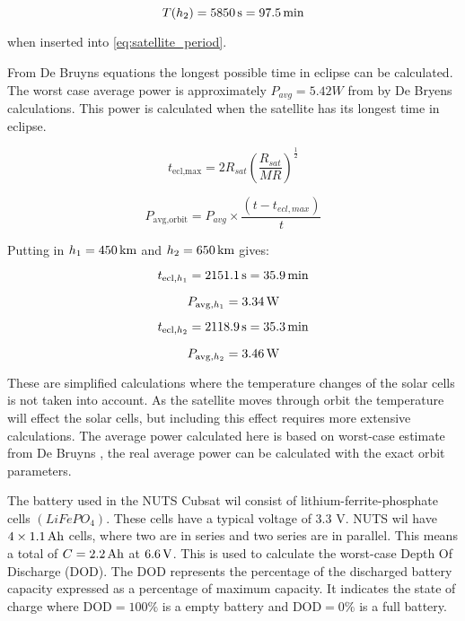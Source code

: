 \begin{equation}
T(h_2) = \unit[5850]{s} = \unit[97.5]{min}
\end{equation}

when inserted into \autoref{eq:satellite_period}.

From De Bruyns equations \cite{Satellite Power Systems} the longest possible time in eclipse can be calculated. The worst case average power is approximately $P_{avg} = 5.42 W$ from by De Bryens calculations. This power is calculated when the satellite has its longest time in eclipse.

\begin{equation}
	t_{\text{ecl,max}} = 2R_{sat}\left(\frac{R_{sat}}{MR}\right)^{\frac{1}{2}}
	\label{Maximum time in eclipse}
\end{equation}

\begin{equation}
	P_{\text{avg,orbit}} = P_{avg}\times\frac{(t-t_{ecl,max})}{t}
	\label{Average effect during one orbit}
\end{equation}

Putting in $h_1 =\unit[450]{km}$ and $h_2 = \unit[650]{km}$ gives:

\begin{equation}
t_{\text{ecl},h_1 } = \unit[2151.1]{s} = \unit[35.9]{min}
\end{equation}

\begin{equation}
P_{\text{avg},h_1} = \unit[3.34]{W}
\end{equation}

\begin{equation}
t_{\text{ecl},h_2} = \unit[2118.9]{s} = \unit[35.3]{min}
\end{equation}

\begin{equation}
P_{\text{avg},h_2} = \unit[3.46]{W}
\end{equation}

These are simplified calculations where the temperature changes of the solar cells is not taken into account. As the satellite moves through orbit the temperature will effect the solar cells, but including this effect requires more extensive calculations. The average power calculated here is based on worst-case estimate from De Bruyns \cite{Satellite Power Systems}, the real average power can be calculated with the exact orbit parameters. 

The battery used in the NUTS Cubsat wil consist of lithium-ferrite-phosphate cells $(LiFePO_4)$\cite{Overview of NUTS}. 
These cells have a typical voltage of 3.3 V. NUTS wil have $4\times \unit[1.1]{Ah}$ cells, where two are in series and two series are in parallel. This means a total of $C=\unit[2.2]{Ah}$ at $\unit[6.6]{V}$\cite{Satellite Power Systems}. This is used to calculate the worst-case Depth Of Discharge (DOD). The DOD represents the percentage of the discharged battery capacity expressed as a percentage of maximum capacity. It indicates the state of charge where $\text{DOD} = 100\% $ is a empty battery and $\text{DOD}=0\%$ is a full battery.


